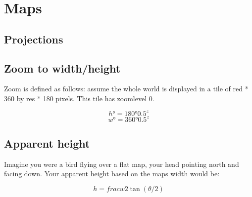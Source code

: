 \section{Maps}

\subsection{Projections}

\subsection{Zoom to width/height}
Zoom is defined as follows: assume the whole world is displayed in a tile of red * 360 by res * 180 pixels. This tile has zoomlevel 0.

$$ h° = 180° 0.5^z $$
$$ w° = 360° 0.5^z $$

\subsection{Apparent height}
Imagine you were a bird flying over a flat map, your head pointing north and facing down. Your apparent height based on the maps width would be:

$$ h = frac{w}{2 \tan(\theta / 2)} $$